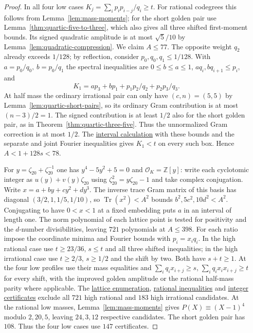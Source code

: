 \documentclass[11pt,reqno]{amsart}
\newcommand{\codecheck}[2]{\href{https://github.com/sebastienpalcoux/grothendieck-ring-classification/blob/d5750105bb5758f3ad38d2e5464dfcc12c019816/supplements/rank6/sphericality/#1}{#2}}
\theoremstyle{remark}\newtheorem{remark}[theorem]{Remark}
\numberwithin{equation}{section}
\begin{document}
\begin{proof}
In all four low cases
$K_j=\sum_i p_i p_{i-j}/q_i\ge t$. For rational codegrees this
follows from Lemma~\ref{lem:mass-moments}; for the short golden
pair use Lemma~\ref{thm:quartic-five-to-three}, which also gives
all three shifted first-moment bounds. Its signed quadratic
amplitude is at most $\sqrt5/10$ by Lemma~\ref{lem:quadratic-compression}.
We claim $A\le77$. The opposite weight $q_2$ already exceeds $1/128$;
by reflection, consider $p_0,q_0,q_1\le1/128$. With
$a=p_0/q_0,\ b=p_0/q_1$ the spectral inequalities are
$0\le b\le a\le1$, $a q_i,bq_{i+1}\le p_i$, and
\[
 K_1=a p_3+b p_1+p_1p_2/q_2+p_2p_3/q_3.
\]
At half mass the ordinary irrational pair can only have
$(c,n)=(5,5)$ by Lemma~\ref{lem:quartic-short-pairs}, so its
ordinary Gram contribution is at most $(n-3)/2=1$.
The signed contribution is at least $1/2$ also for the short
golden pair, as in Theorem~\ref{thm:quartic-three-five}. Thus the
unnormalized Gram correction is at most $1/2$.
The \codecheck{quartic_more/c20_bound.py}{interval calculation}
with these bounds and the separate and joint Fourier inequalities
gives $K_1<t$ on every such box. Hence $A<1+128s<78$.

For $y=\zeta_{20}+\zeta_{20}^{-1}$ one has $y^4-5y^2+5=0$ and
$\mathcal O_K=\mathbb Z[y]$: write each cyclotomic integer as
$u(y)+v(y)\zeta_{20}$ using $\zeta_{20}^2=y\zeta_{20}-1$ and take
complex conjugation.
Write $x=a+by+cy^2+dy^3$. The inverse trace Gram matrix of this
basis has diagonal $(3/2,1,1/5,1/10)$, so $\operatorname{Tr}(x^2)<A^2$
bounds $b^2,5c^2,10d^2<A^2$. Conjugating to have $0<x<1$ at a
fixed embedding puts $a$ in an interval of length one. The norm
polynomial of each lattice point is tested for positivity and the
$d$-number divisibilities, leaving $721$ polynomials at $A\le398$.
For each ratio impose the coordinate minima and Fourier bounds with
$p_i=x_iq_i$. In the high rational case use $t\ge23/36$, $s\le t$
and all three shifted inequalities; in the high irrational case use
$t\ge2/3$, $s\ge1/2$ and the shift by two. Both have $s+t\ge1$.
At the four low profiles use their mass equalities and
$\sum_iq_ix_{i+j}\ge s$, $\sum_iq_ix_ix_{i+j}\ge t$ for every
shift, with the improved golden amplitude or the rational half-mass
parity where applicable.
The \codecheck{quartic_more/cyclic20.cpp}{lattice enumeration},
\codecheck{quartic_more/c20_candidates.py}{rational inequalities} and
\codecheck{quartic_more/c20_duals.json}{integer certificates} exclude
all $721$ high rational and $183$ high irrational candidates. At the rational low masses,
Lemma~\ref{lem:mass-moments} gives $P(X)\equiv(X-1)^4$ modulo
$2,20,5$, leaving $24,3,12$ respective candidates. The short
golden pair has $108$. Thus the four low cases use $147$ certificates.
\end{proof}
\end{document}

